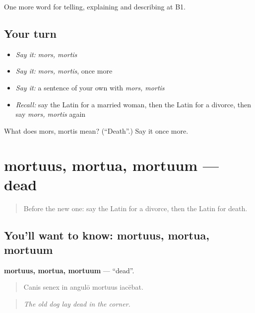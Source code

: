 \begin{grammarlens}[title={What you've built}]
One more word for telling, explaining and describing at B1.
\end{grammarlens}

\subsection*{Your turn}
\begin{itemize}
\raggedright
  \item \emph{Say it:} \emph{mors, mortis}
  \item \emph{Say it:} \emph{mors, mortis}, once more
  \item \emph{Say it:} a sentence of your own with \emph{mors, mortis}
  \item \emph{Recall:} say the Latin for a married woman, then the Latin for a divorce, then say \emph{mors, mortis} again
\end{itemize}

\begin{tcolorbox}[breakable,colback=teal!4,colframe=teal!35!black,title={Before you move on}]
What does mors, mortis mean? (\textquotedblleft{}Death\textquotedblright{}.) Say it once more.
\end{tcolorbox}
\section[mortuus, mortua, mortuum]{mortuus, mortua, mortuum — dead}

\label{lesson:LA-C329-mortuus}



\begin{quote}
Before the new one: say the Latin for a divorce, then the Latin for death.
\end{quote}

\subsection*{You'll want to know: mortuus, mortua, mortuum}
\textbf{mortuus, mortua, mortuum} — \textquotedblleft{}dead\textquotedblright{}.

\begin{quote}
Canis senex in angulō mortuus iacēbat.
\end{quote}

\begin{quote}
\emph{The old dog lay dead in the corner.}
\end{quote}

